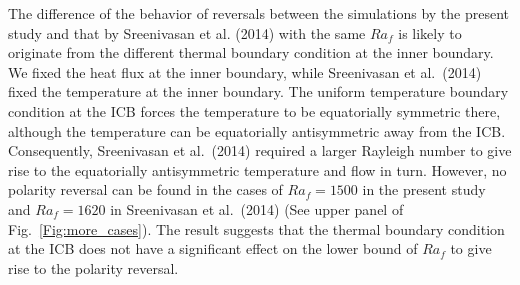 The difference of the behavior of reversals between the simulations by the present study and that by Sreenivasan et al. (2014) with the same $Ra_{f}$ is likely to originate from the different thermal boundary condition at the inner boundary. 
We fixed the heat flux at the inner boundary, while Sreenivasan et al.\ (2014) fixed the temperature at the inner boundary. 
The uniform temperature boundary condition at the ICB forces the temperature to be equatorially symmetric there, although the temperature can be equatorially antisymmetric away from the ICB.
Consequently, Sreenivasan et al.\ (2014) required a larger Rayleigh number to give rise to the equatorially antisymmetric temperature and flow in turn. 
However, no polarity reversal can be found in the cases of $Ra_f = 1500$ in the present study and $Ra_f = 1620$ in Sreenivasan et al.\ (2014) (See upper panel of Fig.~\ref{Fig:more_cases}). 
The result suggests that the thermal boundary condition at the ICB does not have a significant effect on the lower bound of $Ra_f$ to give rise to the polarity reversal.



